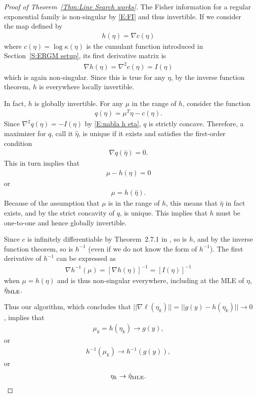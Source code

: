\begin{proof}[Proof of Theorem~\ref{Thm:Line Search works}]

The Fisher information for a regular exponential family is non-singular by 
\eqref{E:FI} and thus invertible.  If we consider the map defined by
\begin{align*}
	h(\eta) = \nabla c(\eta)
\end{align*}
where $c(\eta) = \log \kappa(\eta)$ is the cumulant function introduced in Section~\ref{S:ERGM setup}, its first derivative matrix is
\begin{align}
	\nabla h(\eta) = \nabla^2 c(\eta) = I(\eta) \label{E:nabla h eta}
\end{align}
which is again non-singular.  Since this is true for any $\eta$, by the inverse 
function theorem, $h$ is everywhere 
locally invertible.

In fact, $h$ is globally invertible. For any $\mu$ in the range of $h$, consider the 
function
\begin{align*}
	q(\eta) = \mu^T\eta - c(\eta).
\end{align*}
Since $\nabla^2 q(\eta) = - I(\eta)$ by \eqref{E:nabla h eta}, $q$ is strictly 
concave.  Therefore, a maximizer for $q$, call it $\hat{\eta}$, is unique if it exists and satisfies the first-order condition
\begin{align*}
	\nabla q( \hat{\eta} ) = 0.
\end{align*}
This in turn implies that
\begin{align*}
	\mu - h(\hat{\eta}) = 0
\end{align*} 
or
\begin{align*}
	\mu = h( \hat{\eta} ). %
\end{align*}
Because of the assumption that $\mu$ is in the range of $h$, this means that 
$\hat{\eta}$ in fact exists, and by the 
strict concavity of $q$, is unique.  This implies that $h$ must be one-to-one and 
hence globally invertible.


Since $c$ is infinitely differentiable by Theorem~2.7.1 in \citet{TSH}, so is $h$, and 
by the inverse function theorem, 
so is $h^{-1}$ (even if we do not know the form of $h^{-1}$).  The first derivative of 
$h^{-1}$ can be expressed as
\begin{align*}
	\nabla h^{-1}(\mu) = \left [ \nabla h(\eta) \right ]^{-1} 
		= \left [ I(\eta) \right ]^{-1}
\end{align*}
when $\mu = h(\eta)$ and is thus non-singular everywhere, including at the MLE of 
$\eta$, $\hat{\eta}_{\textrm{MLE}}$.

Thus our algorithm, which concludes that 
$|| \nabla \ell( \eta_k) ||  = || g(y) - h(\eta_k) || \to 0$, implies that 
\begin{align*}
	\mu_k = h(\eta_k) \to g(y), 
\end{align*}
or
\begin{align*}
	h^{-1}(\mu_k)  \to h^{-1}\left (g(y) \right),
\end{align*}
or
\begin{align*}
	\eta_k  \to  \hat{\eta}_{\textrm{MLE}}.
\end{align*}

\end{proof}




